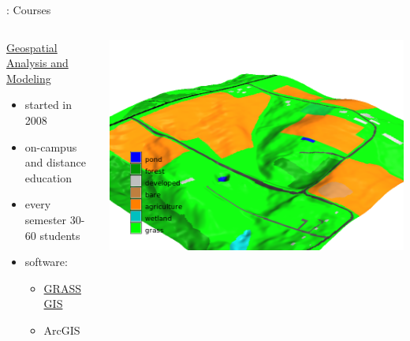 \documentclass[xcolor={dvipsnames,usenames},beamer,aspectratio=169]{beamer}
\begin{document}
\begin{frame}{\geoforalllab: Courses}

\begin{columns}[c]


\begin{block}{\href{http://courses.ncsu.edu/gis582/common/}%
  {Geospatial Analysis and Modeling}}
\begin{itemize}
 \item started in 2008
 \item on-campus and distance education
 \item every semester 30-60 students
 \item software:
 \begin{itemize}
   \item \href{http://grass.osgeo.org}{GRASS GIS}
   \item ArcGIS
 \end{itemize}
\end{itemize}
\end{block}


\includegraphics[width=\textwidth]{./images/edu/secref}%

\end{columns}

\end{frame}
\end{document}
